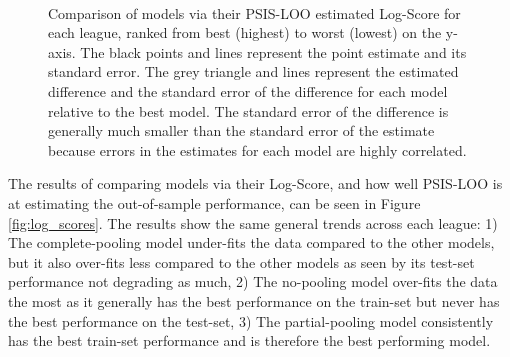 \begin{figure}
	 \\
	\caption{Comparison of models via their PSIS-LOO estimated Log-Score for each league, ranked from best (highest) to worst (lowest) on the y-axis. The black points and lines represent the point estimate and its standard error. The grey triangle and lines represent the estimated difference and the standard error of the difference for each model relative to the best model. The standard error of the difference is generally much smaller than the standard error of the estimate because errors in the estimates for each model are highly correlated.}
	\label{fig:psis_loo}
\end{figure}

The results of comparing models via their Log-Score, and how well PSIS-LOO is at estimating the out-of-sample performance, can be seen in Figure \ref{fig:log_scores}. The results show the same general trends across each league: 1) The complete-pooling model under-fits the data compared to the other models, but it also over-fits less compared to the other models as seen by its test-set performance not degrading as much, 2) The no-pooling model over-fits the data the most as it generally has the best performance on the train-set but never has the best performance on the test-set, 3) The partial-pooling model consistently has the best train-set performance and is therefore the best performing model.


